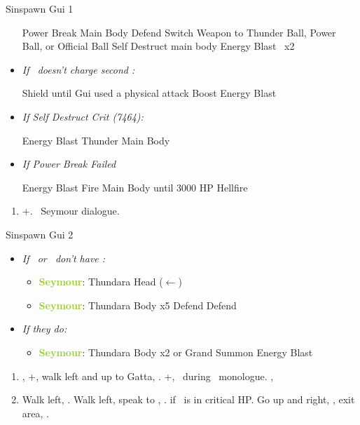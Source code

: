 \begin{battle}[12000]{Sinspawn Gui 1}
  \begin{itemize}
    \switch{\yuna}{\auron}
    \auronf Power Break Main Body
    \tidusf Defend
    \wakkaf Switch Weapon to Thunder Ball, Power Ball, or Official Ball
    \switch{\wakka}{\kimahri}
    \kimahrif Self Destruct main body
    \switch{\tidus}{\yuna}
    \summon{\valefor}
    \valeforf Energy Blast \od\ x2
    \item \textit{If \valefor\ doesn't charge second \od:}
          \begin{itemize}
            \valeforf Shield until Gui used a physical attack
            \valeforf Boost
            \valeforf Energy Blast \od
          \end{itemize}
  \item \textit{If Self Destruct Crit \textit{(7464)}:}
  	\begin{itemize}
  		\valeforf Energy Blast
  		\valeforf Thunder Main Body
	\end{itemize}
  \item \textit{If Power Break Failed}
  	\begin{itemize}
  		\valeforf Energy Blast
  		\summon{\ifrit}
  		\ifritf Fire Main Body until 3000 HP
  		\ifritf Hellfire
	\end{itemize}
  \end{itemize}
\end{battle}
\begin{enumerate}[resume]
  \item \cs+\skippablefmv[2:20]. \sd\ Seymour dialogue.
\end{enumerate}
\begin{battle}[6000]{Sinspawn Gui 2}
  \begin{itemize}
  \item \textit{If \yuna\ or \valefor\ don't have \od:}
  \begin{itemize}
    \item \textbf{\textcolor{YellowGreen}{Seymour}}: Thundara Head ($\leftarrow$)
    \item \textbf{\textcolor{YellowGreen}{Seymour}}: Thundara Body x5
          \yunaf Defend
          \auronf Defend
          \end{itemize}
	\item \textit{If they do:}
	\begin{itemize}
	    \item \textbf{\textcolor{YellowGreen}{Seymour}}: Thundara Body x2
	    \summon{\valefor} or Grand Summon \valefor
	    \valeforf Energy Blast
	 \end{itemize}
  \end{itemize}
\end{battle}
\begin{enumerate}[resume]
  \item \sd, \cs+\skippablefmv[2:00], walk left and up to Gatta, \sd. \fmv+\cs[1:30], \sd\ during \tidus\ monologue. \cs[1:00], \sd
  \item Walk left, \sd. Walk left, speak to \auron, \sd. \save if \auron\ is in critical HP. Go up and right, \sd, exit area, \sd.
\end{enumerate}


